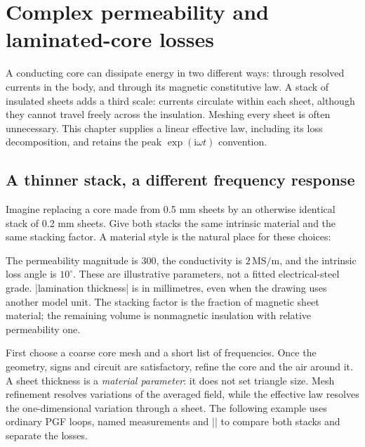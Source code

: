 \section{Complex permeability and laminated-core losses}
\label{sec:losses}

A conducting core can dissipate energy in two different ways: through resolved
currents in the body, and through its magnetic constitutive law. A stack of
insulated sheets adds a third scale: currents circulate within each sheet,
although they cannot travel freely across the insulation. Meshing every sheet
is often unnecessary. This chapter supplies a linear effective law, including
its loss decomposition, and retains the peak $\exp(\mathrm i\omega t)$ convention.

\subsection{A thinner stack, a different frequency response}
Imagine replacing a core made from 0.5 mm sheets by an otherwise identical
stack of 0.2 mm sheets. Give both stacks the same intrinsic material and the
same stacking factor. A material style is the natural place for these choices:
\begin{codeexample}
\end{codeexample}
The permeability magnitude is 300, the conductivity is $2\,\mathrm{MS/m}$,
and the intrinsic loss angle is $10^\circ$. These are illustrative parameters,
not a fitted electrical-steel grade. |lamination thickness| is in millimetres,
even when the drawing uses another model unit. The stacking factor is the
fraction of magnetic sheet material; the remaining volume is nonmagnetic
insulation with relative permeability one.

First choose a coarse core mesh and a short list of frequencies. Once the
geometry, signs and circuit are satisfactory, refine the core and the air
around it. A sheet thickness is a \emph{material parameter}: it does not set
triangle size. Mesh refinement resolves variations of the averaged field,
while the effective law resolves the one-dimensional variation through a sheet.
The following example uses ordinary PGF loops, named measurements
and |\femmresultplot| to compare both stacks and separate the losses.

